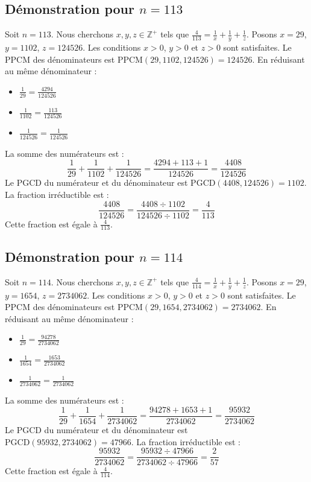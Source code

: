\documentclass[11pt,a4paper]{article}
\begin{document}
\subsection{Démonstration pour $n = 113$}
Soit $n = 113$. Nous cherchons $x, y, z \in \mathbb{Z}^{+}$ tels que $\frac{4}{113} = \frac{1}{x} + \frac{1}{y} + \frac{1}{z}$.
Posons $x = 29$, $y = 1102$, $z = 124526$.
Les conditions $x > 0$, $y > 0$ et $z > 0$ sont satisfaites.
Le PPCM des dénominateurs est $\text{PPCM}(29, 1102, 124526) = 124526$.
En réduisant au même dénominateur :
\begin{itemize}
    \item $\frac{1}{29} = \frac{4294}{124526}$
    \item $\frac{1}{1102} = \frac{113}{124526}$
    \item $\frac{1}{124526} = \frac{1}{124526}$
\end{itemize}
La somme des numérateurs est :
$$ \frac{1}{29} + \frac{1}{1102} + \frac{1}{124526} = \frac{4294 + 113 + 1}{124526} = \frac{4408}{124526} $$
Le PGCD du numérateur et du dénominateur est $\text{PGCD}(4408, 124526) = 1102$.
La fraction irréductible est :
$$ \frac{4408}{124526} = \frac{4408 \div 1102}{124526 \div 1102} = \frac{4}{113} $$
Cette fraction est égale à $\frac{4}{113}$.

\subsection{Démonstration pour $n = 114$}
Soit $n = 114$. Nous cherchons $x, y, z \in \mathbb{Z}^{+}$ tels que $\frac{4}{114} = \frac{1}{x} + \frac{1}{y} + \frac{1}{z}$.
Posons $x = 29$, $y = 1654$, $z = 2734062$.
Les conditions $x > 0$, $y > 0$ et $z > 0$ sont satisfaites.
Le PPCM des dénominateurs est $\text{PPCM}(29, 1654, 2734062) = 2734062$.
En réduisant au même dénominateur :
\begin{itemize}
    \item $\frac{1}{29} = \frac{94278}{2734062}$
    \item $\frac{1}{1654} = \frac{1653}{2734062}$
    \item $\frac{1}{2734062} = \frac{1}{2734062}$
\end{itemize}
La somme des numérateurs est :
$$ \frac{1}{29} + \frac{1}{1654} + \frac{1}{2734062} = \frac{94278 + 1653 + 1}{2734062} = \frac{95932}{2734062} $$
Le PGCD du numérateur et du dénominateur est $\text{PGCD}(95932, 2734062) = 47966$.
La fraction irréductible est :
$$ \frac{95932}{2734062} = \frac{95932 \div 47966}{2734062 \div 47966} = \frac{2}{57} $$
Cette fraction est égale à $\frac{4}{114}$.
\end{document}
